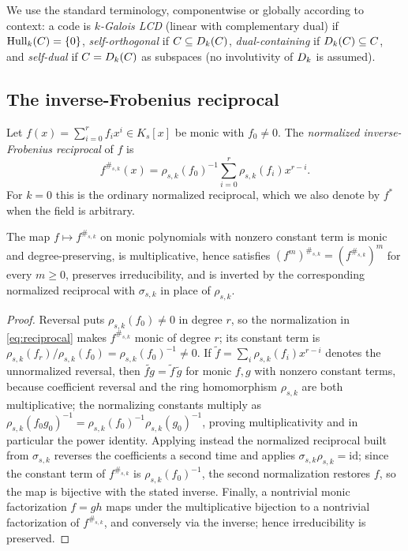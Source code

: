 We use the standard terminology, componentwise or globally according to
context: a code is \emph{$k$-Galois LCD} (linear with complementary dual) if
$\operatorname{Hull}_k(C)=\{0\}$, \emph{self-orthogonal} if $C\subseteq D_k(C)$,
\emph{dual-containing} if $D_k(C)\subseteq C$, and \emph{self-dual} if
$C=D_k(C)$ as subspaces (no involutivity of $D_k$ is assumed).

\subsection{The inverse-Frobenius reciprocal}\label{sec:reciprocal}

Let $f(x)=\sum_{i=0}^{r}f_ix^i\in K_s[x]$ be monic with $f_0\neq0$.  The
\emph{normalized inverse-Frobenius reciprocal} of $f$ is
\begin{equation}\label{eq:reciprocal}
f^{\#_{s,k}}(x)
   =\rho_{s,k}(f_0)^{-1}\sum_{i=0}^{r}\rho_{s,k}(f_i)x^{r-i}.
\end{equation}
For $k=0$ this is the ordinary normalized reciprocal, which we also denote by
$f^\ast$ when the field is arbitrary.

\begin{lemma}\label{lem:reciprocal}
The map $f\mapsto f^{\#_{s,k}}$ on monic polynomials with nonzero constant term
is monic and degree-preserving, is multiplicative, hence satisfies
$(f^m)^{\#_{s,k}}=(f^{\#_{s,k}})^m$ for every $m\geq0$, preserves
irreducibility, and is inverted by the corresponding normalized reciprocal with
$\sigma_{s,k}$ in place of $\rho_{s,k}$.
\end{lemma}

\begin{proof}
Reversal puts $\rho_{s,k}(f_0)\neq0$ in degree $r$, so the normalization in
\eqref{eq:reciprocal} makes $f^{\#_{s,k}}$ monic of degree $r$; its constant
term is $\rho_{s,k}(f_r)/\rho_{s,k}(f_0)=\rho_{s,k}(f_0)^{-1}\neq0$.  If
$\widetilde{f}=\sum_i\rho_{s,k}(f_i)x^{r-i}$ denotes the unnormalized reversal,
then $\widetilde{fg}=\widetilde{f}\,\widetilde{g}$ for monic $f,g$ with nonzero
constant terms, because coefficient reversal and the ring homomorphism
$\rho_{s,k}$ are both multiplicative; the normalizing constants multiply as
$\rho_{s,k}(f_0g_0)^{-1}=\rho_{s,k}(f_0)^{-1}\rho_{s,k}(g_0)^{-1}$, proving
multiplicativity and in particular the power identity.  Applying instead the
normalized reciprocal built from $\sigma_{s,k}$ reverses the coefficients a
second time and applies $\sigma_{s,k}\rho_{s,k}=\mathrm{id}$; since the constant
term of $f^{\#_{s,k}}$ is $\rho_{s,k}(f_0)^{-1}$, the second normalization
restores $f$, so the map is bijective with the stated inverse.  Finally, a
nontrivial monic factorization $f=gh$ maps under the multiplicative bijection
to a nontrivial factorization of $f^{\#_{s,k}}$, and conversely via the inverse;
hence irreducibility is preserved.
\end{proof}


